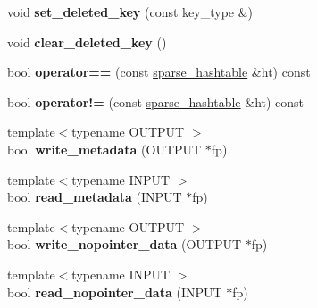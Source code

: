 \begin{DoxyCompactItemize}
\item 
void {\bfseries set\+\_\+deleted\+\_\+key} (const key\+\_\+type \&)\hypertarget{classspp___1_1sparse__hashtable_a90153d7eb880cfef962b735d69eddd3d}{}\label{classspp___1_1sparse__hashtable_a90153d7eb880cfef962b735d69eddd3d}

\item 
void {\bfseries clear\+\_\+deleted\+\_\+key} ()\hypertarget{classspp___1_1sparse__hashtable_aa4c42d87647c78e663165d83588c79ed}{}\label{classspp___1_1sparse__hashtable_aa4c42d87647c78e663165d83588c79ed}

\item 
bool {\bfseries operator==} (const \hyperlink{classspp___1_1sparse__hashtable}{sparse\+\_\+hashtable} \&ht) const \hypertarget{classspp___1_1sparse__hashtable_a4c801a123ddddb30af9dd5f4da56f02e}{}\label{classspp___1_1sparse__hashtable_a4c801a123ddddb30af9dd5f4da56f02e}

\item 
bool {\bfseries operator!=} (const \hyperlink{classspp___1_1sparse__hashtable}{sparse\+\_\+hashtable} \&ht) const \hypertarget{classspp___1_1sparse__hashtable_a7571831cc80fa05efbe319116612e10b}{}\label{classspp___1_1sparse__hashtable_a7571831cc80fa05efbe319116612e10b}

\item 
{\footnotesize template$<$typename O\+U\+T\+P\+UT $>$ }\\bool {\bfseries write\+\_\+metadata} (O\+U\+T\+P\+UT $\ast$fp)\hypertarget{classspp___1_1sparse__hashtable_a1861b0d84da2e51a741708e0bca0609b}{}\label{classspp___1_1sparse__hashtable_a1861b0d84da2e51a741708e0bca0609b}

\item 
{\footnotesize template$<$typename I\+N\+P\+UT $>$ }\\bool {\bfseries read\+\_\+metadata} (I\+N\+P\+UT $\ast$fp)\hypertarget{classspp___1_1sparse__hashtable_a1f6405d1efa8f1e7ef050c7341d7a06e}{}\label{classspp___1_1sparse__hashtable_a1f6405d1efa8f1e7ef050c7341d7a06e}

\item 
{\footnotesize template$<$typename O\+U\+T\+P\+UT $>$ }\\bool {\bfseries write\+\_\+nopointer\+\_\+data} (O\+U\+T\+P\+UT $\ast$fp)\hypertarget{classspp___1_1sparse__hashtable_a93704d659c88f145cd2d4ad059c44242}{}\label{classspp___1_1sparse__hashtable_a93704d659c88f145cd2d4ad059c44242}

\item 
{\footnotesize template$<$typename I\+N\+P\+UT $>$ }\\bool {\bfseries read\+\_\+nopointer\+\_\+data} (I\+N\+P\+UT $\ast$fp)\hypertarget{classspp___1_1sparse__hashtable_ac3bee2c6f59b0abb5d667e7de9230138}{}\label{classspp___1_1sparse__hashtable_ac3bee2c6f59b0abb5d667e7de9230138}


\end{DoxyCompactItemize}
